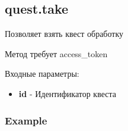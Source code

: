 \subsection{quest.take}
Позволяет взять квест обработку

Метод требует access\_token

Входные параметры:
\begin{itemize}
  \item \textbf{id} - Идентификатор квеста
\end{itemize}

\subsubsection{Example}
\begin{Verbatim}[frame=single]

\end{Verbatim}